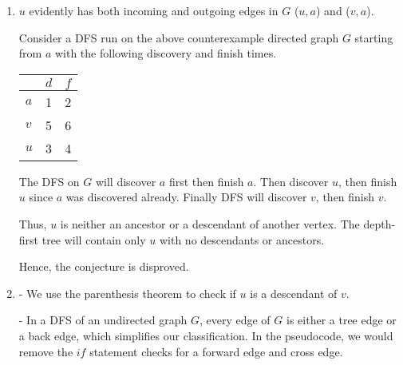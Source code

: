 \documentclass[a4paper]{report}
\begin{document}
\begin{enumerate}
    \item

      $u$ evidently has both incoming and outgoing edges in $G$ ($u,a$) and ($v,a$).

      Consider a DFS run on the above counterexample directed graph $G$ starting from $a$ with the 
      following discovery and finish times.  

      \begin{center}
        \begin{tabular}{ l | c | r }
          \hline
            & $d$ & $f$ \\ \hline
          $a$ & 1 & 2 \\
          $v$ & 5 & 6 \\
          $u$ & 3 & 4 \\
          \hline  
        \end{tabular}
      \end{center}


      The DFS on $G$ will discover $a$ first then finish $a$. Then discover $u$, then finish $u$ since
      $a$ was discovered already. Finally DFS will discover $v$, then finish $v$.

      Thus, $u$ is neither an ancestor or a descendant of another vertex. The depth-first tree
      will contain only $u$ with no descendants or ancestors. 

      Hence, the conjecture is disproved.

    \pagebreak
    \par
    \bigskip

    \item
      - We use the parenthesis theorem to check if $u$ is a descendant of $v$. 

      - In a DFS of an undirected graph $G$, every edge of $G$ is either a tree edge or a back edge, which simplifies
      our classification. In the pseudocode, we would remove the $if$ statement checks for a forward edge and cross edge.


\end{enumerate}
\end{document}
